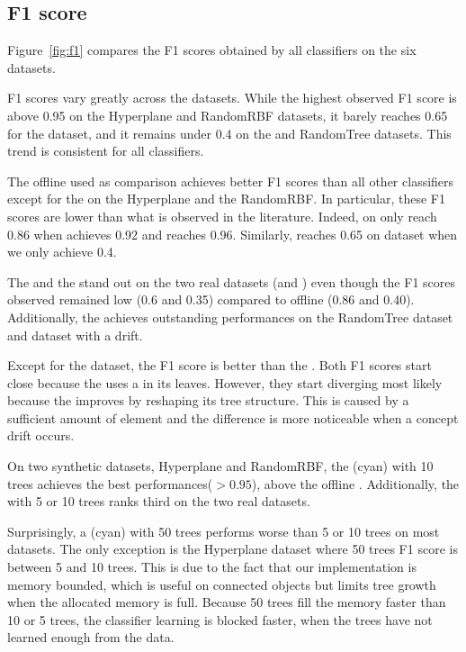 \subsection{F1 score}
Figure~\ref{fig:f1} compares the F1 scores obtained by all classifiers on the
six datasets.

F1 scores vary greatly across the datasets. While the highest
observed F1 score is above 0.95 on the Hyperplane and RandomRBF datasets,
it barely reaches 0.65 for the \banosdataset dataset, and it remains under
0.4 on the \recofitdataset and RandomTree datasets. This trend is
consistent for all classifiers.

The offline \knn used as comparison achieves better F1 scores than all other
classifiers except for the \mondrianforest on the Hyperplane and the RandomRBF.
In particular, these F1 scores are lower than what is observed in the literature.
Indeed, on \banosdataset \knn only reach 0.86 when \cite{behzad2019} achieves
0.92 and \cite{Banos_2014} reaches 0.96. Similarly, \cite{behzad2019} reaches
0.65 on \recofitdataset dataset when we only achieve 0.4.

The \naivebayes and the \hoeffdingtree stand out on the two real datasets
(\banosdataset and \recofitdataset) even though the F1 scores observed remained
low (0.6 and 0.35) compared to offline \knn (0.86 and 0.40). Additionally, the
\hoeffdingtree achieves outstanding performances on the RandomTree dataset and
\banosdataset dataset with a drift.

Except for the \banosdataset dataset, the \hoeffdingtree F1 score is better than
the \naivebayes. Both F1 scores start close because the \hoeffdingtree uses a
\naivebayes in its leaves.  However, they start diverging most likely because
the \hoeffdingtree improves by reshaping its tree structure.  This is caused by
a sufficient amount of element and the difference is more noticeable when a
concept drift occurs.

On two synthetic datasets, Hyperplane and RandomRBF, the \mondrianforest (cyan)
with 10 trees achieves the best performances($> 0.95$), above the offline \knn.
Additionally, the \mondrianforest with 5 or 10 trees ranks third on the two real
datasets.

Surprisingly, a \mondrianforest (cyan) with 50 trees performs worse than 5 or 10
trees on most datasets. The only exception is the Hyperplane dataset where
50 trees F1 score is between 5 and 10 trees. This is due to the fact that
our \mondrianforest implementation is memory bounded, which is
useful on connected objects but limits tree growth when the allocated memory is
full. Because 50 trees fill the memory faster than 10 or 5 trees, the
classifier learning is blocked faster, when the trees have not learned enough
from the data.

